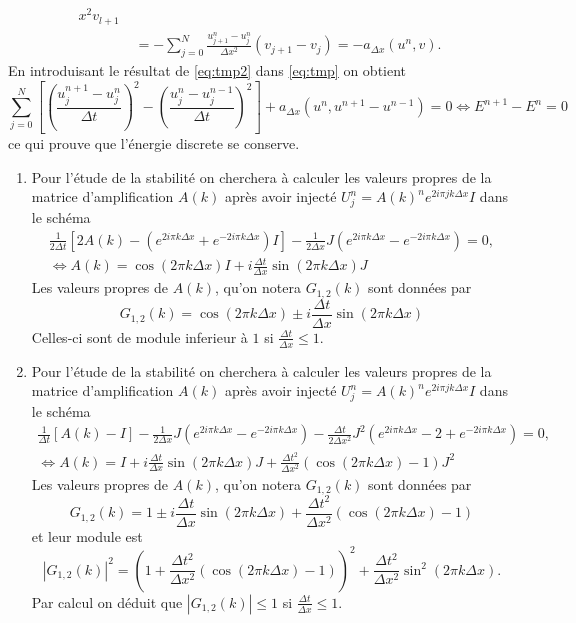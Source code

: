 \documentclass[12pt,a4paper]{article}
\begin{document}
\begin{enumerate}
\begin{equation}
\begin{array}{l}
{  x^2}v_{l+1}\\
\qquad \qquad= -\displaystyle\sum_{j=0}^N \frac{u_{j+1}^{n}-u_j^{n}}{\Delta
  x^2}(v_{j+1}-v_j) = -a_{\Delta x} (u^n,v).
\end{array}
\end{equation}
En introduisant le r\'esultat de \eqref{eq:tmp2} dans \eqref{eq:tmp}
on obtient
\begin{equation}
\displaystyle \sum_{j=0}^N\left[\left(\frac{u_j^{n+1}-u_j^n}{\Delta
    t}\right)^2 - \left(\frac{u_j^{n}-u_j^{n-1}}{\Delta
    t}\right)^2 \right] + a_{\Delta x} (u^n,u^{n+1}-u^{n-1})=0
\Leftrightarrow E^{n+1}-E^n=0
\end{equation}
ce qui prouve que l'\'energie discrete se conserve.
\end{enumerate}
\begin{enumerate}
\item Pour l'\'etude de la stabilit\'e on cherchera \`a calculer les
  valeurs propres de la matrice d'amplification $A(k)$ apr\`es avoir
  inject\'e $U_j^n =A(k)^n e^{2i\pi jk\Delta x} I$ dans le sch\'ema
$$
\begin{array}{l}
\displaystyle\frac{1}{2\Delta t}\left[2A(k)-(e^{2i\pi k\Delta x}+e^{-2i\pi k\Delta
    x})I \right] -\frac{1}{2\Delta x} J (e^{2i\pi k\Delta x}-e^{-2i\pi k\Delta
    x})=0,\\
\displaystyle\Leftrightarrow A(k)= \cos(2\pi k\Delta x)I +i\frac{\Delta t}{\Delta
  x} \sin(2\pi k\Delta x) J
\end{array}
$$
Les valeurs propres de $A(k)$, qu'on notera $G_{1,2}(k)$ sont
donn\'ees par
\begin{equation}
G_{1,2}(k) = \cos(2\pi k\Delta x) \pm i \frac{\Delta t}{\Delta
  x} \sin(2\pi k\Delta x)
\end{equation}
Celles-ci sont de module inferieur \`a $1$ si $\frac{\Delta t}{\Delta
  x}  \le 1$.
\item Pour l'\'etude de la stabilit\'e on cherchera \`a calculer les
  valeurs propres de la matrice d'amplification $A(k)$ apr\`es avoir
  inject\'e $U_j^n =A(k)^n e^{2i\pi jk\Delta x} I$ dans le sch\'ema
$$
\begin{array}{l}
\displaystyle\frac{1}{\Delta t}\left[A(k) - I \right] -\frac{1}{2\Delta x} J (e^{2i\pi k\Delta x}-e^{-2i\pi k\Delta
    x}) -\frac{\Delta t}{2\Delta x^2} J^2 (e^{2i\pi k\Delta x}-2+e^{-2i\pi k\Delta
    x}) =0,\\
\displaystyle\Leftrightarrow A(k)= I +i\frac{\Delta t}{\Delta
  x} \sin(2\pi k\Delta x) J+ \frac{\Delta t^2}{\Delta x^2}(\cos(2\pi k\Delta x)-1)J^2
\end{array}
$$
Les valeurs propres de $A(k)$, qu'on notera $G_{1,2}(k)$ sont
donn\'ees par
\begin{equation}
G_{1,2}(k) = 1\pm i \frac{\Delta t}{\Delta
  x} \sin(2\pi k\Delta x) + \frac{\Delta t^2}{\Delta x^2}(\cos(2\pi k\Delta x)-1)
\end{equation}
 et leur module est
$$
|G_{1,2}(k)|^2 = \left(1 + \frac{\Delta t^2}{\Delta x^2}(\cos(2\pi k\Delta x)-1)\right)^2+\frac{\Delta t^2}{\Delta
  x^2} \sin^2(2\pi k\Delta x).
$$
Par calcul on d\'eduit que $|G_{1,2}(k)|\le 1$ si $\frac{\Delta t}{\Delta
  x}  \le 1$.
\end{enumerate}
\end{document}
